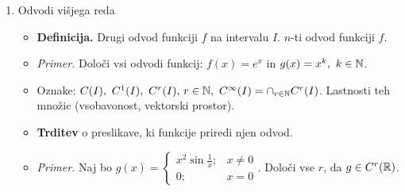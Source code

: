 \begin{enumerate}
    \item Odvodi višjega reda
    \begin{itemize}
        \item \colorbox{purple!30}{\textbf{Definicija.}} Drugi odvod funkciji $f$ na intervalu $I$. $n$-ti odvod funkciji $f$.
        \item \colorbox{yellow!30}{\emph{Primer.}} Določi vsi odvodi funkcij: $f(x) = e^x$ in $g(x) = x^k, \ k \in \mathbb{N}$.
        \item Oznake: $C(I), \ C^1(I), \ C^r(I), \, r \in \mathbb{N}, \ C^\infty(I) = \cap_{r \in \mathbb{N}} C^r(I)$. Lastnosti teh množic (vsobavonost, vektorski prostor).
        \item \colorbox{blue!30}{\textbf{Trditev}} o preslikave, ki funkcije priredi njen odvod.
        \item \colorbox{yellow!30}{\emph{Primer.}} Naj bo $g(x) = \begin{cases}
            x^2 \sin \frac{1}{x}; &x \neq 0 \\
            0; &x = 0
        \end{cases}$. Določi vse $r$, da $g \in C^r(\mathbb{R})$.
    \end{itemize}


\end{enumerate}
